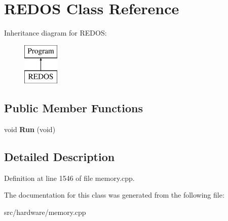 \hypertarget{classREDOS}{\section{R\-E\-D\-O\-S Class Reference}
\label{classREDOS}
}
Inheritance diagram for R\-E\-D\-O\-S\-:\begin{figure}[H]
\begin{center}
\leavevmode
\includegraphics[height=2.000000cm]{classREDOS}
\end{center}
\end{figure}
\subsection*{Public Member Functions}
\begin{DoxyCompactItemize}
\item 
\hypertarget{classREDOS_aa2d659599de1058d1b59069bfad7da76}{void {\bfseries Run} (void)}\label{classREDOS_aa2d659599de1058d1b59069bfad7da76}

\end{DoxyCompactItemize}


\subsection{Detailed Description}


Definition at line 1546 of file memory.\-cpp.



The documentation for this class was generated from the following file\-:\begin{DoxyCompactItemize}
\item 
src/hardware/memory.\-cpp\end{DoxyCompactItemize}
